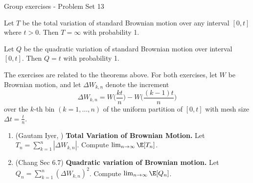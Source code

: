 \documentclass[10pt]{beamer}
\begin{document}
\begin{frame}{Group exercises - Problem Set 13}
\footnotesize 

\begin{mygreenbox}[title=Theorem (Gautam Iyer)]
Let $T$ be the total variation of standard Brownian motion over any interval $[0,t]$ where $t>0$. Then $T=\infty$ with probability 1. 
\end{mygreenbox}

\begin{mygreenbox}[title=Theorem (Chang 6.7)]
Let $Q$ be the quadratic variation of standard Brownian motion over interval $[0,t]$. Then $Q=t$ with probability 1. 
\end{mygreenbox}

The exercises are related to the theorems above. For both exercises, let $W$ be Brownian motion, and let $\Delta W_{k,n}$ denote the increment 
	\[ \Delta W_{k,n} = W \bigg( \frac{kt}{n} \bigg) -  W \bigg( \frac{(k-1)t}{n} \bigg)\] 
	over the $k$-th bin $(k=1, \hdots, n)$ of the uniform partition of $[0,t]$ with mesh size $\Delta t=\frac{t}{n}$.
	
\begin{enumerate}
	\item (Gautam Iyer, \textit{\href{https://www.math.cmu.edu/~gautam/sj/teaching/2021-22/944-scalc-finance1/pdfs/ch3-int.pdf}{\underline{}}}) \textbf{Total Variation of Brownian Motion.}   Let $T_n = \sum_{k=1}^{n} |\Delta W_{k,n}|$.  Compute $\lim_{n \to \infty} \E[T_n]$.  
	\item (Chang Sec 6.7) \textbf{Quadratic variation of Brownian motion.} Let $Q_n = \sum_{k=1}^{n} (\Delta W_{k,n})^2$.  Compute $\lim_{n \to \infty} \E[Q_n]$.

\end{enumerate}




\end{frame}
\end{document}
